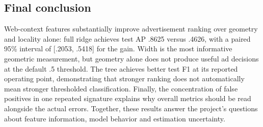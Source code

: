 \documentclass[11pt,a4paper]{article}
\begin{document}
\subsection{Final conclusion}
Web-context features substantially improve advertisement ranking over geometry and locality alone: full ridge achieves test AP .8625 versus .4626, with a paired 95\% interval of [.2053, .5418] for the gain. Width is the most informative geometric measurement, but geometry alone does not produce useful ad decisions at the default .5 threshold. The tree achieves better test F1 at its reported operating point, demonstrating that stronger ranking does not automatically mean stronger thresholded classification. Finally, the concentration of false positives in one repeated signature explains why overall metrics should be read alongside the actual errors. Together, these results answer the project's questions about feature information, model behavior and estimation uncertainty.
\end{document}
